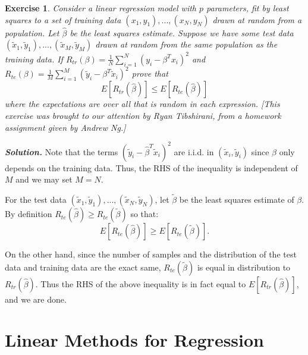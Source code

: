 \documentclass[12pt]{article}
\newtheorem{exercise}{Exercise}[section]
\newenvironment{solution}[1][\it{Solution}]{\textbf{#1. } }{\vspace{.5cm}}
\begin{document}
\begin{exercise}
    Consider a linear regression model with $p$ parameters, fit by least
squares to a set of training data $(x_1, y_1), . . . , (x_N, y_N)$ drawn at random
from a population. Let $\hat{\beta}$ be the least squares estimate. Suppose we have
some test data $(\tilde{x}_1, \tilde{y}_1), . . . , (\tilde{x}_M, \tilde{y}_M)$ drawn at random from the same population
as the training data. If $R_{tr}(\beta) =\frac{1}{N} \sum_{i=1}^N(y_i - \beta^T x_i)^2$ and $R_{te}(\beta) =\frac{1}{M} \sum_{i=1}^M(\tilde{y}_i - \beta^T \tilde{x}_i)^2$ prove that
$$E[R_{tr}(\hat{\beta})] \leq  E[R_{te}(\hat{\beta})]$$
where the expectations are over all that is random in each expression. [This
exercise was brought to our attention by Ryan Tibshirani, from a homework
assignment given by Andrew Ng.]
\end{exercise}
\begin{solution}
    Note that the terms $(\tilde{y}_i - \hat{\beta}^T \tilde{x}_i)^2$ are i.i.d. in $(\tilde{x}_i, \tilde{y}_i)$ since $\hat{\beta}$ only depends on the training data. Thus, the RHS of the inequality is independent of $M$ and we may set $M = N$. 
    
    For the test data $(\tilde{x}_1, \tilde{y}_1), . . . , (\tilde{x}_N, \tilde{y}_N)$, let $\tilde{\beta}$ be the least squares estimate of $\beta$. By definition $R_{te}(\hat{\beta}) \geq R_{te}(\tilde{\beta})$ so that:
    $$E[R_{te}(\hat{\beta})] \geq E[R_{te}(\tilde{\beta})].$$
    
    On the other hand, since the number of samples and the distribution of the test data and training data are the exact same, $R_{te}(\tilde{\beta})$ is equal in distribution to $R_{tr}(\hat{\beta})$. Thus the RHS of the above inequality is in fact equal to $E[R_{tr}(\hat{\beta})]$, and we are done.
\end{solution}



\newpage
\section{Linear Methods for Regression}
\hrulefill
\vspace{.6cm}
\end{document}
